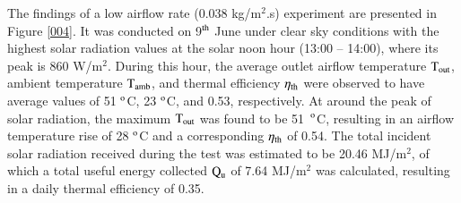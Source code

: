 The findings of a low airflow rate (0.038 kg/m$^2$.s) experiment are presented in Figure \ref{004}. It was conducted on 9$^{\rm{th}}$ June under clear sky conditions with the highest solar radiation values at the solar noon hour (13:00 -- 14:00), where its peak is 860 W/m$^2$. During this hour, the average outlet airflow temperature $\rm{T_{out}}$, ambient temperature $\rm{T_{amb}}$, and thermal efficiency $\eta_{\rm{th}}$ were observed to have average values of 51 $^{\rm{o}}$C, 23 $^{\rm{o}}$C, and 0.53, respectively. At around the peak of solar radiation, the maximum $\rm{T_{out}}$ was found to be 51~$^{\rm{o}}$C, resulting in an airflow temperature rise of 28 $^{\rm{o}}$C and a corresponding $\eta_{\rm{th}}$ of 0.54. The total incident solar radiation received during the test was estimated to be 20.46 MJ/m$^2$, of which a total useful energy collected $\rm{Q_{u}}$ of 7.64 MJ/m$^2$ was calculated, resulting in a daily thermal efficiency of 0.35.

